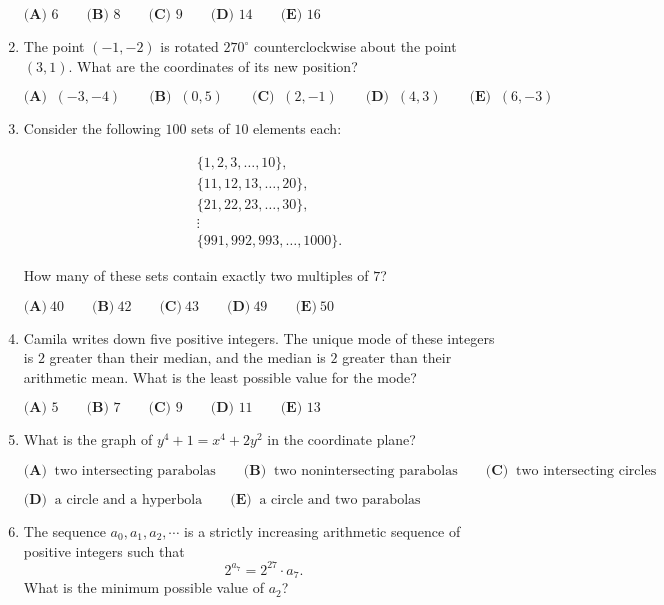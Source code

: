 \documentclass{article}
\begin{document}
\begin{enumerate}[label=\arabic*., itemsep=0.5em]
\(\textbf{(A) }6 \qquad \textbf{(B) }8 \qquad \textbf{(C) }9 \qquad \textbf{(D) }14 \qquad \textbf{(E) }16\)\par \vspace{0.5em}\item The point \((-1, -2)\) is rotated \(270^{\circ}\) counterclockwise about the point \((3, 1)\). What are the coordinates of its new position?

\(\textbf{(A) }\ (-3, -4) \qquad \textbf{(B) }\ (0,5) \qquad \textbf{(C) }\ (2,-1) \qquad \textbf{(D) }\ (4,3) \qquad \textbf{(E) }\ (6,-3)\)\par \vspace{0.5em}\item Consider the following \(100\) sets of \(10\) elements each:

\begin{align*}
&\{1,2,3,\ldots,10\}, \\
&\{11,12,13,\ldots,20\},\\
&\{21,22,23,\ldots,30\},\\
&\vdots\\
&\{991,992,993,\ldots,1000\}.
\end{align*}

How many of these sets contain exactly two multiples of \(7\)?

\(\textbf{(A)}\ 40\qquad\textbf{(B)}\ 42\qquad\textbf{(C)}\ 43\qquad\textbf{(D)}\ 49\qquad\textbf{(E)}\ 50\)\par \vspace{0.5em}\item Camila writes down five positive integers. The unique mode of these integers is \(2\) greater than their median, and the median is \(2\) greater than their arithmetic mean. What is the least possible value for the mode?

\(\textbf{(A) }5\qquad\textbf{(B) }7\qquad\textbf{(C) }9\qquad\textbf{(D) }11\qquad\textbf{(E) }13\)\par \vspace{0.5em}\item What is the graph of \(y^4+1=x^4+2y^2\) in the coordinate plane?

\(\textbf{(A) }\ \text{two intersecting parabolas} \qquad \textbf{(B) }\ \text{two nonintersecting parabolas} \qquad \textbf{(C) }\ \text{two intersecting circles} \qquad\)

\(\textbf{(D) }\ \text{a circle and a hyperbola} \qquad \textbf{(E) }\ \text{a circle and two parabolas}\)\par \vspace{0.5em}\item The sequence \(a_0,a_1,a_2,\cdots\) is a strictly increasing arithmetic sequence of positive integers such that 
\begin{equation*}
2^{a_7}=2^{27} \cdot a_7.
\end{equation*}
 What is the minimum possible value of \(a_2\)?


\end{enumerate}
\end{document}
